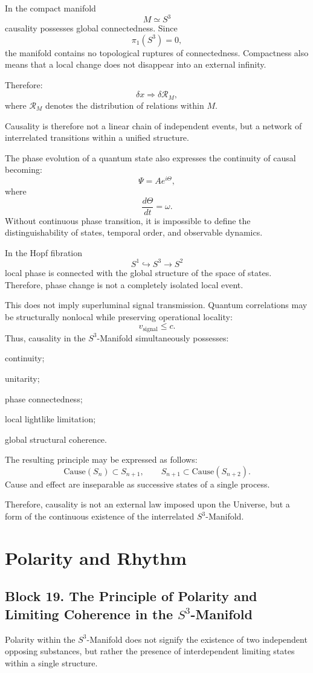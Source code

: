 \documentclass[12pt,a4paper]{article}
\theoremstyle{definition}
\begin{document}
In the compact manifold
\[
M\simeq S^3
\]
causality possesses global connectedness. Since
\[
\pi_1(S^3)=0,
\]
the manifold contains no topological ruptures of connectedness. Compactness also means that a local change does not disappear into an external infinity.

Therefore:
\[
\delta x\Rightarrow \delta \mathcal R_M,
\]
where \(\mathcal R_M\) denotes the distribution of relations within \(M\).

Causality is therefore not a linear chain of independent events, but a network of interrelated transitions within a unified structure.

The phase evolution of a quantum state also expresses the continuity of causal becoming:
\[
\Psi=Ae^{i\Theta},
\]
where
\[
\frac{d\Theta}{dt}=\omega.
\]
Without continuous phase transition, it is impossible to define the distinguishability of states, temporal order, and observable dynamics.

In the Hopf fibration \cite{Hopf1931}
\[
S^1\hookrightarrow S^3\to S^2
\]
local phase is connected with the global structure of the space of states. Therefore, phase change is not a completely isolated local event.

This does not imply superluminal signal transmission. Quantum correlations may be structurally nonlocal while preserving operational locality:
\[
v_{\mathrm{signal}}\leq c.
\]
Thus, causality in the \(S^3\)-Manifold simultaneously possesses:

continuity;

unitarity;

phase connectedness;

local lightlike limitation;

global structural coherence.

The resulting principle may be expressed as follows:
\[
\mathrm{Cause}(S_n)\subset S_{n+1},
\qquad
S_{n+1}\subset \mathrm{Cause}(S_{n+2}).
\]
Cause and effect are inseparable as successive states of a single process.

Therefore, causality is not an external law imposed upon the Universe, but a form of the continuous existence of the interrelated \(S^3\)-Manifold.



\section{Polarity and Rhythm}
\subsection{Block 19. The Principle of Polarity and Limiting Coherence in the \(S^3\)-Manifold}
Polarity within the \(S^3\)-Manifold does not signify the existence of two independent opposing substances, but rather the presence of interdependent limiting states within a single structure.
\end{document}
